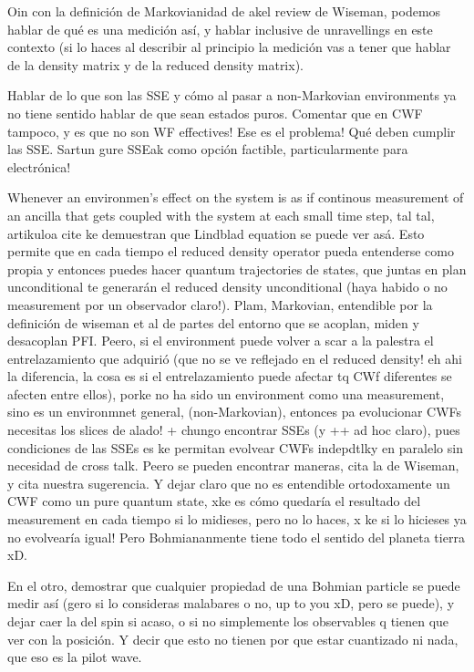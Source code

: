 \documentclass[11pt, a4paper]{article} %
\begin{document}
Oin con la definición de Markovianidad de akel review de Wiseman, podemos hablar de qué es una medición así, y hablar inclusive de unravellings en este contexto (si lo haces al describir al principio la medición vas a tener que hablar de la density matrix y de la reduced density matrix).

Hablar de lo que son las SSE y cómo al pasar a non-Markovian environments ya no tiene sentido hablar de que sean estados puros. Comentar que en CWF tampoco, y es que no son WF effectives! Ese es el problema! 
Qué deben cumplir las SSE.
Sartun gure SSEak como opción factible, particularmente para electrónica!



Whenever an environmen's effect on the system is as if continous measurement of an ancilla that gets coupled with the system at each small time step, tal tal, artikuloa cite ke demuestran que Lindblad equation se puede ver asá. Esto permite que en cada tiempo el reduced density operator pueda entenderse como propia y entonces puedes hacer quantum trajectories de states, que juntas en plan unconditional te generarán el reduced density unconditional (haya habido o no measurement por un observador claro!). Plam, Markovian, entendible por la definición de wiseman et al de partes del entorno que se acoplan, miden y desacoplan PFI. Peero, si el environment puede volver a scar a la palestra el entrelazamiento que adquirió (que no se ve reflejado en el reduced density! eh ahi la diferencia, la cosa es si el entrelazamiento puede afectar tq CWf diferentes se afecten entre ellos), porke no ha sido un environment como una measurement, sino es un environmnet general, (non-Markovian), entonces pa evolucionar CWFs necesitas los slices de alado! + chungo encontrar SSEs (y ++ ad hoc claro), pues condiciones de las SSEs es ke permitan evolvear CWFs indepdtlky en paralelo sin necesidad de cross talk. Peero se pueden encontrar maneras, cita la de Wiseman, y cita nuestra sugerencia. Y dejar claro que no es entendible ortodoxamente un CWF como un pure quantum state, xke es cómo quedaría el resultado del measurement en cada tiempo si lo midieses, pero no lo haces, x ke si lo hicieses ya no evolvearía igual! Pero Bohmiananmente tiene todo el sentido del planeta tierra xD.

En el otro, demostrar que cualquier propiedad de una Bohmian particle se puede medir así (gero si lo consideras malabares o no, up to you xD, pero se puede), y dejar caer la del spin si acaso, o si no simplemente los observables q tienen que ver con la posición. Y decir que esto no tienen por que estar cuantizado ni nada, que eso es la pilot wave.
\end{document}
